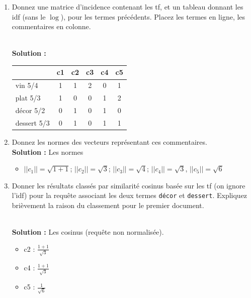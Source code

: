 \documentclass[10pt,a4paper]{article}
\newenvironment{solution}[0]{
~\\ \color{red} \textbf{Solution : }\color{black}}{%
}
\begin{document}
\begin{enumerate}
   \item Donnez une matrice d'incidence contenant les tf, 
      et un tableau donnant les idf (sans le $\log$), pour les  termes précédents. Placez
      les termes en ligne, les commentaires en colonne.

\begin{solution}
\begin{center}
\begin{tabular}{l|c|c|c|c|c}
            & \textbf{c1} & \textbf{c2} & \textbf{c3} &\textbf{c4}&\textbf{c5} \\ \hline  
   vin  5/4   & 1           & 1           & 2           & 0         & 1\\
   plat 5/3  & 1           & 0           & 0           & 1         & 2\\
   décor 5/2  & 0           & 1           & 0           & 1         & 0\\
   dessert 5/3  & 0           & 1           & 0           & 1         & 1\\\hline
   \end{tabular}
\end{center}
\end{solution}

  \item Donnez les normes des vecteurs représentant ces commentaires.
\begin{solution}
Les normes
\begin{itemize}
  \item $||c_1|| = \sqrt{1+ 1}$; $||c_2|| = \sqrt{3}$; $||c_3|| = \sqrt{4}$; 
    $||c_4|| = \sqrt{3}$, $||c_5|| = \sqrt{6}$  
\end{itemize}
\end{solution}
  
  \item Donner les résultats classés par similarité cosinus basée sur les tf 
  (on ignore l'idf) pour la requête associant les deux termes \texttt{décor} et 
  \texttt{dessert}.
     Expliquez brièvement la raison  du classement pour le premier document.

\begin{solution}
Les cosinus (requête non normalisée).

\begin{itemize}
  \item  c2 : $\frac{1+1}{\sqrt{3}}$
   \item  c4 :  $\frac{1+1}{\sqrt{3}}$  
    \item c5 : $\frac{1}{\sqrt{6}}$ 
 \end{itemize}


\end{solution}
\end{enumerate}
\end{document}
